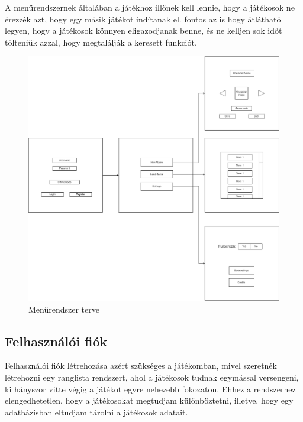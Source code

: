 A menürendszernek általában a játékhoz illőnek kell lennie, hogy a játékosok ne érezzék azt, hogy egy másik játékot indítanak el. fontos az is hogy átlátható legyen, hogy a játékosok könnyen eligazodjanak benne, és ne kelljen sok időt tölteniük azzal, hogy megtalálják a keresett funkciót.

\begin{figure}[H]
    \centering
    \includegraphics[width=14.0truecm]{images/MS_menu.drawio.png}
    \caption{Menürendszer terve}
    \label{fig:Menürendszer terve}
\end{figure}

\subsection{Felhasználói fiók}
Felhasználói fiók létrehozása azért szükséges a játékomban, mivel szeretnék létrehozni egy ranglista rendszert, ahol a játékosok tudnak egymással versengeni, ki hányszor vitte végig a játékot egyre nehezebb fokozaton. Ehhez a rendszerhez elengedhetetlen, hogy a játékosokat megtudjam különböztetni, illetve, hogy egy adatbázisban eltudjam tárolni a játékosok adatait.

